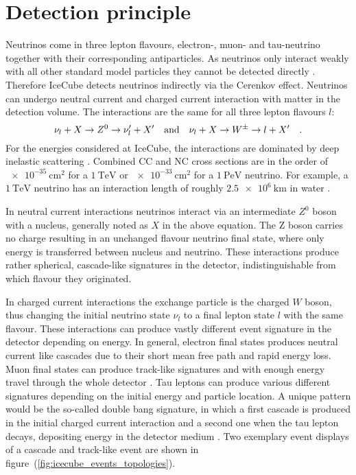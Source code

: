 \section{Detection principle}
Neutrinos come in three lepton flavours, electron-, muon- and tau-neutrino together with their corresponding antiparticles.
As neutrinos only interact weakly with all other standard model particles they cannot be detected directly .
Therefore IceCube detects neutrinos indirectly via the Cerenkov effect.
Neutrinos can undergo neutral current and charged current interaction with matter in the detection volume.
The interactions are the same for all three lepton flavours $l$:
\begin{equation}
  \nu_l + X \rightarrow Z^0 \rightarrow \nu'_l + X'
  \quad\text{and}\quad
  \nu_l + X \rightarrow W^{\pm} \rightarrow l + X'
  \quad\text{.}
\end{equation}
For the energies considered at IceCube, the interactions are dominated by deep inelastic scattering .
Combined CC and NC cross sections are in the order of $\SI{e-35}{\cm\squared}$ for a $\SI{1}{\TeV}$ or $\SI{e-33}{\cm\squared}$ for a $\SI{1}{\peta\eV}$ neutrino.
For example, a $\SI{1}{\TeV}$ neutrino has an interaction length of roughly $\SI{2.5e6}{\km}$ in water .

In neutral current interactions neutrinos interact via an intermediate $Z^0$ boson with a nucleus, generally noted as $X$ in the above equation.
The Z boson carries no charge resulting in an unchanged flavour neutrino final state, where only energy is transferred between nucleus and neutrino.
These interactions produce rather spherical, cascade-like signatures in the detector, indistinguishable from which flavour they originated.

In charged current interactions the exchange particle is the charged $W$ boson, thus changing the initial neutrino state $\nu_l$ to a final lepton state $l$ with the same flavour.
These interactions can produce vastly different event signature in the detector depending on energy.
In general, electron final states produces neutral current like cascades due to their short mean free path and rapid energy loss.
Muon final states can produce track-like signatures and with enough energy travel through the whole detector .
Tau leptons can produce various different signatures depending on the initial energy and particle location.
A unique pattern would be the so-called double bang signature, in which a first cascade is produced in the initial charged current interaction and a second one when the tau lepton decays, depositing energy in the detector medium .
Two exemplary event displays of a cascade and track-like event are shown in figure~(\ref{fig:icecube_events_topologies}).

